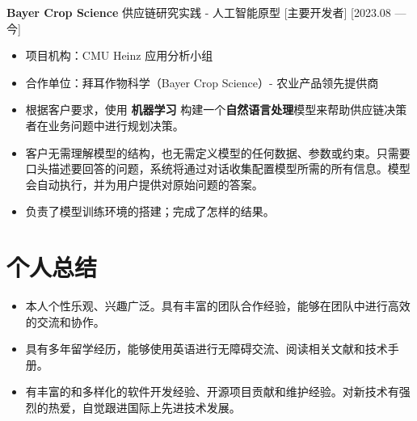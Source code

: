 \documentclass{resume}
\begin{document}
\ResumeItem[Bayer Crop Science]
{\textbf{Bayer Crop Science} 供应链研究实践 - 人工智能原型} %
[主要开发者]
[2023.08 — 今]

\begin{itemize}
  \item 项目机构：CMU Heinz 应用分析小组
  \item 合作单位：拜耳作物科学（Bayer Crop Science）- 农业产品领先提供商
  \item 根据客户要求，使用 \textbf{机器学习} 构建一个\textbf{自然语言处理}模型来帮助供应链决策者在业务问题中进行规划决策。
  \item 客户无需理解模型的结构，也无需定义模型的任何数据、参数或约束。只需要口头描述要回答的问题，系统将通过对话收集配置模型所需的所有信息。模型会自动执行，并为用户提供对原始问题的答案。
  \item 负责了模型训练环境的搭建；完成了怎样的结果。
\end{itemize}

\section{个人总结}

\begin{itemize}
  \item 本人个性乐观、兴趣广泛。具有丰富的团队合作经验，能够在团队中进行高效的交流和协作。
  \item 具有多年留学经历，能够使用英语进行无障碍交流、阅读相关文献和技术手册。
  \item 有丰富的和多样化的软件开发经验、开源项目贡献和维护经验。对新技术有强烈的热爱，自觉跟进国际上先进技术发展。
\end{itemize}
\end{document}
